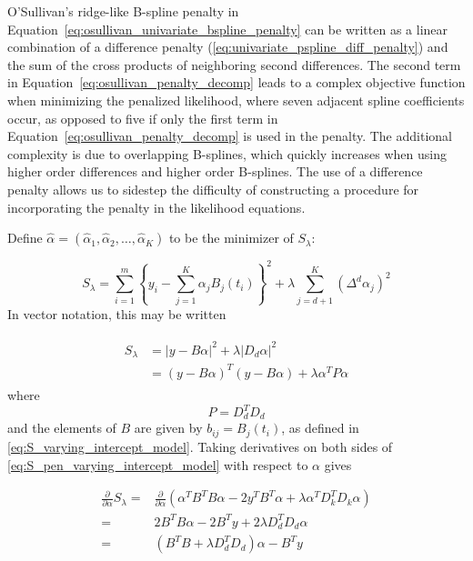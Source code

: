 \documentclass[12pt]{article}
\theoremstyle{definition}
\begin{document}
O'Sullivan's ridge-like B-spline penalty in Equation~\ref{eq:osullivan_univariate_bspline_penalty} can be written as a linear combination of a difference penalty (\ref{eq:univariate_pspline_diff_penalty}) and the sum of the cross products of neighboring second differences. The second term in Equation~\ref{eq:osullivan_penalty_decomp} leads to a complex objective function when minimizing the penalized likelihood, where seven adjacent spline coefficients occur, as opposed to five if only the first term in Equation~\ref{eq:osullivan_penalty_decomp} is used in the penalty. The additional complexity is due to overlapping B-splines, which quickly increases when using higher order differences and higher order B-splines. The use of a difference penalty allows us to sidestep the difficulty of constructing a procedure for incorporating the penalty in the likelihood equations. 

Define $\hat{\alpha} = \left(\hat{\alpha}_1, \hat{\alpha}_2, \dots, \hat{\alpha}_K \right)$ to be the minimizer of $S_\lambda$:

\begin{equation*}  
S_\lambda = \sum_{i=1}^m \left\{ y_i - \sum_{j=1}^K \alpha_j B_j\left(t_i\right) \right\}^2 + \lambda \sum_{j=d+1}^K \left( \Delta^d\alpha_j \right)^2
\end{equation*}
\noindent
In vector notation, this may be written

\begin{align}
\begin{split}
S_\lambda &= \vert y- B\alpha  \vert^2  + \lambda \vert D_d \alpha\vert^2 \\
&=  \left( y- B\alpha  \right)^T \left( y-B \alpha\right) + \lambda \alpha^T P \alpha
\end{split} \label{eq:S_pen_varying_intercept_model}
\end{align}
\noindent
where 
\[
P = D_d^T D_d
\]
\noindent
and the elements of $B$ are given by $b_{ij} = B_j\left(t_i\right)$, as defined in \ref{eq:S_varying_intercept_model}. Taking derivatives on both sides of \ref{eq:S_pen_varying_intercept_model} with respect to $\alpha$ gives

\begin{align}
\frac{\partial}{\partial \alpha}S_\lambda ={} & \frac{\partial}{\partial \alpha}\left(\alpha^TB^TB \alpha -2y^T B^T\alpha+\lambda \alpha^T D_k^T D_k \alpha  \right) \nonumber \\
= {} & 2B^TB \alpha - 2B^T y + 2\lambda D_d^TD_d\alpha \nonumber\\
= {} & \left(B^T B +  \lambda D_d^TD_d\right)\alpha - B^T y \label{eq:dSlambda_dAlpha}
\end{align} 
\noindent
\end{document}
